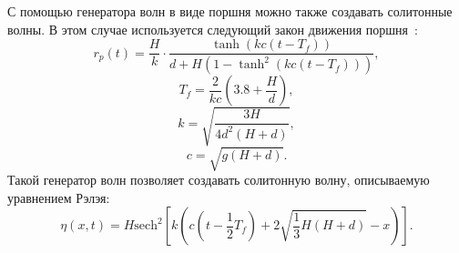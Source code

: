 С помощью генератора волн в виде поршня можно также создавать солитонные волны.
%
В этом случае используется следующий закон движения поршня~\cite{Dominguez2019}:
%
\begin{equation}\label{eq:nwm_solitary}
    r_{p}(t) = \frac{H}{k}\cdot\frac{\tanh(kc (t-T_f))}{d+H(1-\tanh^2(kc (t-T_f)))},
\end{equation}
%
\begin{equation}
    T_f = \frac{2}{kc}\left( 3.8 + \frac{H}{d} \right),
\end{equation}
%
\begin{equation}
    k = \sqrt{\frac{3H}{4d^{2}(H+d)}},
\end{equation}
%
\begin{equation}
    c = \sqrt{g(H+d)}.
\end{equation}
%
Такой генератор волн позволяет создавать солитонную волну, описываемую уравнением Рэлэя:
%
\begin{equation}
    \eta(x, t) = H \text{sech}^2
    \left[
        k \left(
            c\left( t - \frac{1}{2} T_f \right)
            +
            2\sqrt{\frac{1}{3} H(H + d)}
            - x
        \right)
    \right].
\end{equation}

\FloatBarrier
